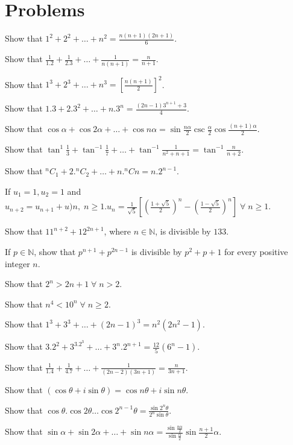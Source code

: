 \section{Problems}
\startitemize[n, 2*broad]
\item Show that $1^2 + 2^2 + \ldots + n^2 = \frac{n(n + 1)(2n + 1)}{6}$.
\item Show that $\frac{1}{1.2} + \frac{1}{2.3} + \ldots + \frac{1}{n(n + 1)} = \frac{n}{n + 1}$.
\item Show that $1^3 + 2^3 + \ldots + n^3 = \left[\frac{n(n + 1)}{2}\right]^2$.
\item Show that $1.3 + 2.3^2 + \ldots + n.3^n = \frac{(2n - 1)3^{n + 1} + 3}{4}$.
\item Show that $\cos\alpha + \cos2\alpha + \ldots + \cos n\alpha = \sin\frac{n\alpha}{2}\csc\frac{\alpha}{2}\cos\frac{(n + 1)\alpha}{2}$.
\item Show that $\tan^{1}\frac{1}{3} + \tan^{-1}\frac{1}{7} + \ldots + \tan^{-1}\frac{1}{n^2 + n + 1} = \tan^{-1}\frac{n}{n + 2}$.
\item Show that ${}^nC_1 + 2.{}^nC_2 + \ldots + n.{}^nCn = n.2^{n - 1}$.
\item If $u_1 = 1, u_2 = 1$ and $u_{n + 2} = u_{n + 1} + u)n,\;n\geq 1. u_n = \frac{1}{\sqrt{5}}\left[\left(\frac{1 +
    \sqrt{5}}{2}\right)^n - \left(\frac{1 - \sqrt{5}}{2}\right)^n\right]\;\forall\;n\geq 1$.
\item Show that $11^{n + 2} + 12^{2n + 1}$, where $n\in\mathbb{N}$, is divisible by $133$.
\item If $p\in\mathbb{N}$, show that $p^{n + 1} + p^{2n - 1}$ is divisible by $p^2 + p + 1$ for every positive integer $n$.
\item Show that $2^n > 2n + 1\;\forall\;n > 2$.
\item Show that $n^4 < 10^n\;\forall\;n\geq 2$.
\item Show that $1^3 + 3^3 + \ldots + (2n - 1)^3 = n^2(2n^2 - 1)$.
\item Show that $3.2^2 + 3^3.2^3 + \ldots + 3^n.2^{n + 1} = \frac{12}{5}(6^n - 1)$.
\item Show that $\frac{1}{1.4} + \frac{1}{4.7} + \ldots + \frac{1}{(2n - 2)(3n + 1)} = \frac{n}{3n+ 1}$.
\item Show that $(\cos\theta + i\sin\theta) = \cos n\theta + i\sin n\theta$.
\item Show that $\cos\theta.\cos2\theta\ldots\cos2^{n - 1}\theta = \frac{\sin2^n\theta}{2^n\sin\theta}$.
\item Show that $\sin\alpha + \sin2\alpha + \ldots + \sin n\alpha = \frac{\sin \frac{n\alpha}{2}}{\sin\frac{\alpha}{2}}\sin\frac{n +
  1}{2}\alpha$.
